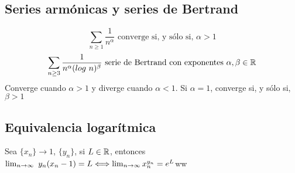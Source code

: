 \subsection{Series armónicas y series de Bertrand}
$$ \sum_{n\geq 1} \frac{1}{n^{\alpha}} \text{ converge si, y sólo si, } \alpha>1 $$
$$ \sum_{n\geq 3} \frac{1}{n^{\alpha}(log\ n)^{\beta}} \text{ serie de Bertrand con exponentes }\alpha,\beta\in\R $$
Converge cuando $\alpha>1$ y diverge cuando $\alpha<1$. Si $\alpha = 1$, converge si, y sólo si, $\beta>1$

\subsection{Equivalencia logarítmica}
Sea $\{x_n\}\rightarrow 1$, $\{y_n\}$, si $L\in\mathbb{R}$, entonces $\lim_{\substack{n\rightarrow\infty}} \ y_n(x_n-1) = L \Longleftrightarrow \lim_{\substack{n\rightarrow\infty}} x_n^{y_n} = e^L$ww